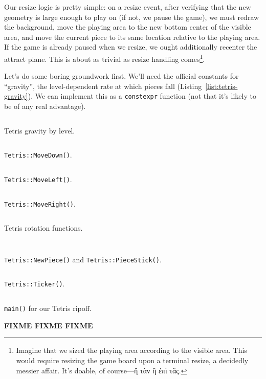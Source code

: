 Our resize logic is pretty simple: on a resize event, after verifying that the
new geometry is large enough to play on (if not, we pause the game), we must
redraw the background, move the playing area to the new bottom center of the
visible area, and move the current piece to its same location relative to the
playing area. If the game is already paused when we resize, we ought
additionally recenter the attract plane. This is about as trivial as resize
handling comes\footnote{Imagine that we sized the playing area according to the
visible area. This would require resizing the game board upon a terminal
resize, a decidedly messier affair. It's doable, of course---\textgreek{ἢ τὰν ἢ ἐπὶ τᾶς}.}.

Let's do some boring groundwork first. We'll need the official constants for
``gravity'', the level-dependent rate at which pieces fall
(Listing~\ref{list:tetris-gravity}). We can implement this as a
\texttt{constexpr} function (not that it's likely to be of any real advantage).

\begin{listing}[!htb]
\inputminted[]{C}{code-tetris/gravity.h}
\caption{Tetris gravity by level.}
\label{list:tetris-gravity}
\end{listing}

\begin{listing}[!htb]
\inputminted[]{C}{code-tetris/movedown.h}
\caption{\texttt{Tetris::MoveDown()}.}
\label{list:tetris-movedown}
\end{listing}

\begin{listing}[!htb]
\inputminted[]{C}{code-tetris/moveleft.h}
\caption{\texttt{Tetris::MoveLeft()}.}
\label{list:tetris-moveleft}
\end{listing}

\begin{listing}[!htb]
\inputminted[]{C}{code-tetris/moveright.h}
\caption{\texttt{Tetris::MoveRight()}.}
\label{list:tetris-moveright}
\end{listing}

\begin{listing}[!htb]
\inputminted[]{C}{code-tetris/rotate.h}
\caption{Tetris rotation functions.}
\label{list:tetris-rotate}
\end{listing}

\begin{listing}[!htb]
\inputminted[]{C}{code-tetris/newpiece.h}
\inputminted[]{C}{code-tetris/stuck.h}
\caption{\texttt{Tetris::NewPiece()} and \texttt{Tetris::PieceStick()}.}
\label{list:tetris-newpiece}
\end{listing}

\begin{listing}[!htb]
\inputminted[]{C}{code-tetris/ticker.h}
\caption{\texttt{Tetris::Ticker()}.}
\label{list:tetris-ticker}
\end{listing}

\begin{listing}[!htb]
\inputminted[]{C}{code-tetris/main.cpp}
\caption{\texttt{main()} for our Tetris ripoff.}
\label{list:tetris-main}
\end{listing}

\textbf{FIXME FIXME FIXME}
